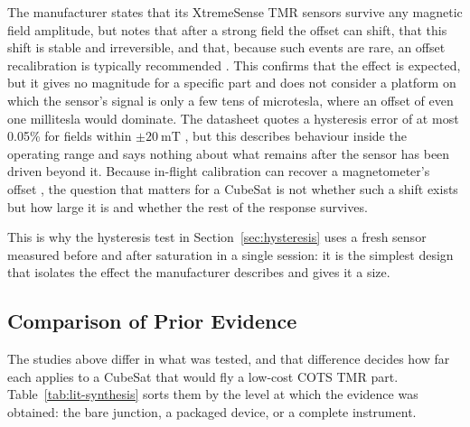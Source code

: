\documentclass[12pt,a4paper]{article}
\begin{document}
The manufacturer states that its XtremeSense TMR sensors survive any magnetic field amplitude, but notes that after a strong field the offset can shift, that this shift is stable and irreversible, and that, because such events are rare, an offset recalibration is typically recommended \cite{allegro_an133}. This confirms that the effect is expected, but it gives no magnitude for a specific part and does not consider a platform on which the sensor's signal is only a few tens of microtesla, where an offset of even one millitesla would dominate. The datasheet quotes a hysteresis error of at most 0.05\% for fields within $\pm\SI{20}{\milli\tesla}$ \cite{ct100_datasheet}, but this describes behaviour inside the operating range and says nothing about what remains after the sensor has been driven beyond it. Because in-flight calibration can recover a magnetometer's offset \cite{archer2015}, the question that matters for a CubeSat is not whether such a shift exists but how large it is and whether the rest of the response survives.

This is why the hysteresis test in Section~\ref{sec:hysteresis} uses a fresh sensor measured before and after saturation in a single session: it is the simplest design that isolates the effect the manufacturer describes and gives it a size.

\subsection{Comparison of Prior Evidence}
\label{sec:lit-synthesis}

The studies above differ in what was tested, and that difference decides how far each applies to a CubeSat that would fly a low-cost COTS TMR part. Table~\ref{tab:lit-synthesis} sorts them by the level at which the evidence was obtained: the bare junction, a packaged device, or a complete instrument.
\end{document}
